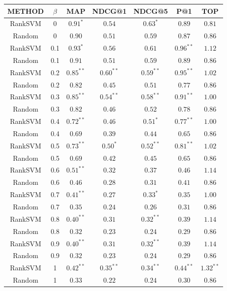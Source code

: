 \begin{tabular}{|c|c|c|c|c|c|c|}
\hline
METHOD & $ \beta $ & MAP & NDCG@1 & NDCG@5 & P@1 & TOP\\ 
\hline
RankSVM & 0 & $0.91^*$ & $0.54$ & $0.63^*$ & $0.89$ & $0.81$\\ 
\hline
Random & 0 & $0.90$ & $0.51$ & $0.59$ & $0.87$ & $0.86$\\ 
\hline
RankSVM & 0.1 & $0.93^*$ & $0.56$ & $0.61$ & $0.96^{**}$ & $1.12$\\ 
\hline
Random & 0.1 & $0.91$ & $0.51$ & $0.59$ & $0.89$ & $0.86$\\ 
\hline
RankSVM & 0.2 & $0.85^{**}$ & $0.60^{**}$ & $0.59^{**}$ & $0.95^{**}$ & $1.02$\\ 
\hline
Random & 0.2 & $0.82$ & $0.45$ & $0.51$ & $0.77$ & $0.86$\\ 
\hline
RankSVM & 0.3 & $0.85^{**}$ & $0.54^{**}$ & $0.58^{**}$ & $0.91^{**}$ & $1.00$\\ 
\hline
Random & 0.3 & $0.82$ & $0.46$ & $0.52$ & $0.78$ & $0.86$\\ 
\hline
RankSVM & 0.4 & $0.72^{**}$ & $0.46$ & $0.51^*$ & $0.77^{**}$ & $1.00$\\ 
\hline
Random & 0.4 & $0.69$ & $0.39$ & $0.44$ & $0.65$ & $0.86$\\ 
\hline
RankSVM & 0.5 & $0.73^{**}$ & $0.50^*$ & $0.52^{**}$ & $0.81^{**}$ & $1.02$\\ 
\hline
Random & 0.5 & $0.69$ & $0.42$ & $0.45$ & $0.65$ & $0.86$\\ 
\hline
RankSVM & 0.6 & $0.51^{**}$ & $0.32$ & $0.37$ & $0.46$ & $1.14$\\ 
\hline
Random & 0.6 & $0.46$ & $0.28$ & $0.31$ & $0.41$ & $0.86$\\ 
\hline
RankSVM & 0.7 & $0.41^{**}$ & $0.27$ & $0.33^*$ & $0.35$ & $1.00$\\ 
\hline
Random & 0.7 & $0.35$ & $0.24$ & $0.26$ & $0.31$ & $0.86$\\ 
\hline
RankSVM & 0.8 & $0.40^{**}$ & $0.31$ & $0.32^{**}$ & $0.39$ & $1.14$\\ 
\hline
Random & 0.8 & $0.32$ & $0.23$ & $0.24$ & $0.29$ & $0.86$\\ 
\hline
RankSVM & 0.9 & $0.40^{**}$ & $0.31$ & $0.32^{**}$ & $0.39$ & $1.14$\\ 
\hline
Random & 0.9 & $0.32$ & $0.23$ & $0.24$ & $0.29$ & $0.86$\\ 
\hline
RankSVM & 1 & $0.42^{**}$ & $0.35^{**}$ & $0.34^{**}$ & $0.44^{**}$ & $1.32^{**}$\\ 
\hline
Random & 1 & $0.33$ & $0.22$ & $0.24$ & $0.30$ & $0.86$\\ 
\hline
\end{tabular}
